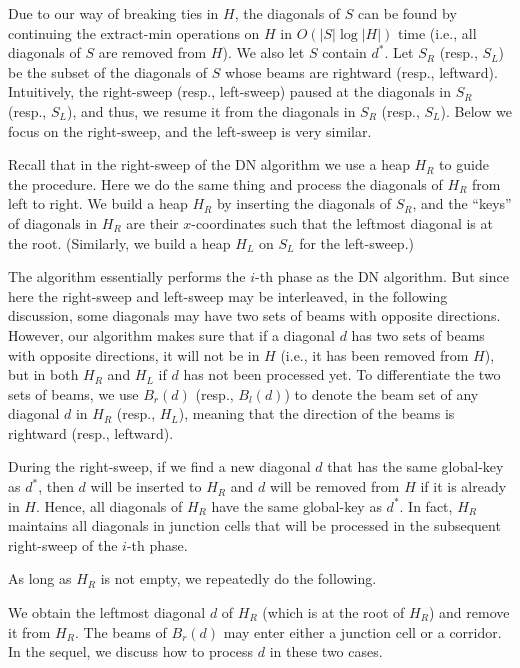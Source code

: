 \documentclass[english,runningheads,11pt]{llncs-revised}
\begin{document}
Due to our way of breaking ties in $H$, the diagonals of $S$ can be found by
continuing the extract-min operations on $H$ in $O(|S|\log|H|)$ time (i.e., all diagonals of $S$ are removed from $H$). We also let $S$ contain $d^*$.
Let $S_R$ (resp., $S_L$) be the subset of the diagonals of $S$ whose beams are rightward (resp., leftward).
Intuitively, the right-sweep (resp., left-sweep) paused at the diagonals in $S_R$ (resp., $S_L$), and thus,
we resume it from the diagonals in $S_R$ (resp.,
$S_L$). Below we focus on the right-sweep, and the left-sweep is very similar.


Recall that in the right-sweep of the DN algorithm we use a heap
$H_R$ to guide the procedure. Here we do the same thing and
process the diagonals of $H_R$ from left to right.
We build a heap $H_R$ by inserting the diagonals of $S_R$, and the
``keys'' of diagonals in $H_R$ are
their $x$-coordinates such that the leftmost diagonal is at the root.
(Similarly, we build a heap $H_L$ on $S_L$ for the left-sweep.)



The algorithm essentially performs the $i$-th phase as the DN
algorithm. But since here the right-sweep and left-sweep may be
interleaved, in the following discussion, some diagonals may have two
sets of beams with opposite directions. However, our algorithm makes
sure that if a diagonal $d$ has
two sets of beams with opposite directions, it will not be in
$H$ (i.e., it has been removed from $H$), but in both $H_R$ and $H_L$
if $d$ has not been processed yet.
To differentiate the two sets of beams, we use $B_r(d)$ (resp., $B_l(d)$) to denote the beam set of any diagonal $d$ in $H_R$ (resp., $H_L$), meaning that the direction of
the beams is rightward (resp., leftward).


During the right-sweep, if we find a new diagonal $d$ that has the same global-key as $d^*$, then $d$ will be inserted to $H_R$ and $d$ will be removed from $H$ if it is already in $H$. Hence, all diagonals of $H_R$ have the same global-key as $d^*$. In fact, $H_R$ maintains all diagonals in junction cells that will be processed in the subsequent right-sweep of the $i$-th phase.

As long as $H_R$ is not empty, we repeatedly do the following.

We obtain the leftmost diagonal $d$ of $H_R$ (which is at the root of $H_R$)
and remove it from $H_R$. The beams of $B_r(d)$ may
enter either a junction cell or a corridor. In the sequel,
we discuss how to process $d$ in these two cases.
\end{document}
